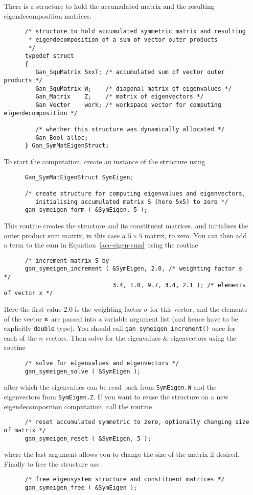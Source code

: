 There is a structure to hold the accumulated matrix and the resulting
eigendecomposition matrices:
\begin{verbatim}
      /* structure to hold accumulated symmetric matrix and resulting
       * eigendecomposition of a sum of vector outer products
       */
      typedef struct
      {
         Gan_SquMatrix SxxT; /* accumulated sum of vector outer products */
         Gan_SquMatrix W;    /* diagonal matrix of eigenvalues */
         Gan_Matrix    Z;    /* matrix of eigenvectors */
         Gan_Vector    work; /* workspace vector for computing eigendecomposition */

         /* whether this structure was dynamically allocated */
         Gan_Bool alloc;
      } Gan_SymMatEigenStruct;
\end{verbatim}
To start the computation, create an instance of the structure using
\begin{verbatim}
      Gan_SymMatEigenStruct SymEigen;

      /* create structure for computing eigenvalues and eigenvectors,
         initialising accumulated matrix S (here 5x5) to zero */
      gan_symeigen_form ( &SymEigen, 5 );
\end{verbatim}
This routine creates the structure and its constituent matrices, and
initialises the outer product sum matrix, in this case a $5\times 5$ matrix,
to zero. You can then add a term to the sum in Equation~\ref{acc-eigen-sum}
using the routine
\begin{verbatim}
      /* increment matrix S by 
      gan_symeigen_increment ( &SymEigen, 2.0, /* weighting factor s */
                               3.4, 1.0, 9.7, 3.4, 2.1 ); /* elements of vector x */
\end{verbatim}
Here the first value $2.0$ is the weighting factor $\sigma$ for this vector,
and the elements of the vector ${\bf x}$ are passed into a variable argument
list (and hence have to be explicitly {\tt double} type).
You should call {\tt gan\_symeigen\_increment()} once for each of the
$n$ vectors. Then solve for the eigenvalues \& eigenvectors using the routine
\begin{verbatim}
      /* solve for eigenvalues and eigenvectors */
      gan_symeigen_solve ( &SymEigen );
\end{verbatim}
after which the eigenvalues can be read back from {\tt SymEigen.W} and the
eigenvectors from {\tt SymEigen.Z}.
If you want to reuse the structure on a new eigendecomposition computation,
call the routine
\begin{verbatim}
      /* reset accumulated symmetric to zero, optionally changing size of matrix */
      gan_symeigen_reset ( &SymEigen, 5 );
\end{verbatim}
where the last argument allows you to change the size of the matrix if
desired. Finally to free the structure use
\begin{verbatim}
      /* free eigensystem structure and constituent matrices */
      gan_symeigen_free ( &SymEigen );
\end{verbatim}

